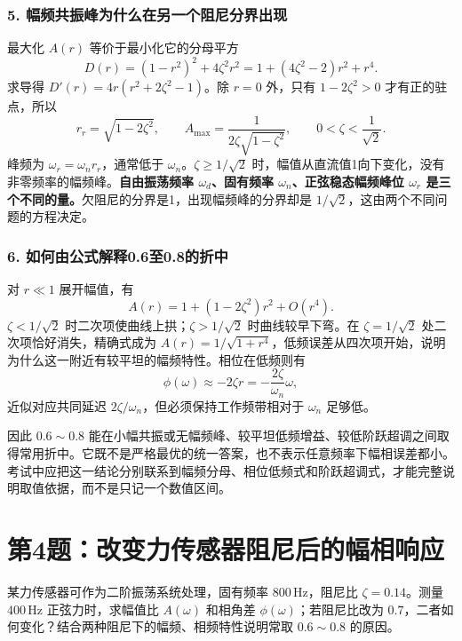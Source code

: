 \subsubsection*{5. 幅频共振峰为什么在另一个阻尼分界出现}
最大化 $A(r)$ 等价于最小化它的分母平方
\[
D(r)=(1-r^2)^2+4\zeta^2r^2
=1+(4\zeta^2-2)r^2+r^4.
\]
求导得 $D'(r)=4r(r^2+2\zeta^2-1)$。除 $r=0$ 外，只有 $1-2\zeta^2>0$ 才有正的驻点，所以
\[
\boxed{r_r=\sqrt{1-2\zeta^2},\qquad
A_{\max}=\frac{1}{2\zeta\sqrt{1-\zeta^2}}},
\qquad 0<\zeta<\frac{1}{\sqrt2}.
\]
峰频为 $\omega_r=\omega_nr_r$，通常低于 $\omega_n$。$\zeta\geq1/\sqrt2$ 时，幅值从直流值1向下变化，没有非零频率的幅频峰。\textbf{自由振荡频率 $\omega_d$、固有频率 $\omega_n$、正弦稳态幅频峰位 $\omega_r$ 是三个不同的量。}欠阻尼的分界是1，出现幅频峰的分界却是 $1/\sqrt2$，这由两个不同问题的方程决定。

\subsubsection*{6. 如何由公式解释0.6至0.8的折中}
对 $r\ll1$ 展开幅值，有
\[
A(r)=1+(1-2\zeta^2)r^2+O(r^4).
\]
$\zeta<1/\sqrt2$ 时二次项使曲线上拱；$\zeta>1/\sqrt2$ 时曲线较早下弯。在 $\zeta=1/\sqrt2$ 处二次项恰好消失，精确式成为
$A(r)=1/\sqrt{1+r^4}$，低频误差从四次项开始，说明为什么这一附近有较平坦的幅频特性。相位在低频则有
\[
\phi(\omega)\approx-2\zeta r
=-\frac{2\zeta}{\omega_n}\omega,
\]
近似对应共同延迟 $2\zeta/\omega_n$，但必须保持工作频带相对于 $\omega_n$ 足够低。

因此 $0.6\sim0.8$ 能在小幅共振或无幅频峰、较平坦低频增益、较低阶跃超调之间取得常用折中。它既不是严格最优的统一答案，也不表示任意频率下幅相误差都小。考试中应把这一结论分别联系到幅频分母、相位低频式和阶跃超调式，才能完整说明取值依据，而不是只记一个数值区间。

\section{第4题：改变力传感器阻尼后的幅相响应}
\label{hw:3-4}
\begin{hwquestion}
某力传感器可作为二阶振荡系统处理，固有频率 $800\,\mathrm{Hz}$，阻尼比 $\zeta=0.14$。测量 $400\,\mathrm{Hz}$ 正弦力时，求幅值比 $A(\omega)$ 和相角差 $\phi(\omega)$；若阻尼比改为 $0.7$，二者如何变化？结合两种阻尼下的幅频、相频特性说明常取 $0.6\sim0.8$ 的原因。
\end{hwquestion}

